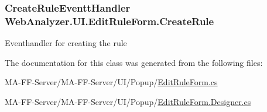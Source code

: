\subsubsection[{Create\+Rule}]{\setlength{\rightskip}{0pt plus 5cm}Create\+Rule\+Eventt\+Handler Web\+Analyzer.\+U\+I.\+Edit\+Rule\+Form.\+Create\+Rule}\label{class_web_analyzer_1_1_u_i_1_1_edit_rule_form_a270cf87236a05ce56741d8df75a16a0c}


Eventhandler for creating the rule 



The documentation for this class was generated from the following files\+:\begin{DoxyCompactItemize}
\item 
M\+A-\/\+F\+F-\/\+Server/\+M\+A-\/\+F\+F-\/\+Server/\+U\+I/\+Popup/\hyperlink{_edit_rule_form_8cs}{Edit\+Rule\+Form.\+cs}\item 
M\+A-\/\+F\+F-\/\+Server/\+M\+A-\/\+F\+F-\/\+Server/\+U\+I/\+Popup/\hyperlink{_edit_rule_form_8_designer_8cs}{Edit\+Rule\+Form.\+Designer.\+cs}\end{DoxyCompactItemize}
